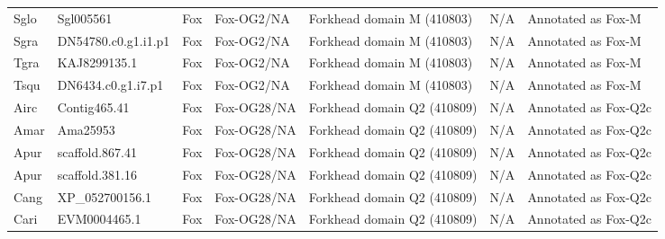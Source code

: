 \documentclass[../main.tex]{subfiles}
\begin{document}
\begin{landscape}
\begin{longtable}{lllllll}
		Sglo           & Sgl005561             & Fox            & Fox-OG2/NA          & Forkhead domain M (410803)                  & N/A                                                                    & Annotated as Fox-M   \\
		Sgra           & DN54780.c0.g1.i1.p1   & Fox            & Fox-OG2/NA          & Forkhead domain M (410803)                  & N/A                                                                    & Annotated as Fox-M   \\
		Tgra           & KAJ8299135.1          & Fox            & Fox-OG2/NA          & Forkhead domain M (410803)                  & N/A                                                                    & Annotated as Fox-M   \\
		Tsqu           & DN6434.c0.g1.i7.p1    & Fox            & Fox-OG2/NA          & Forkhead domain M (410803)                  & N/A                                                                    & Annotated as Fox-M   \\
		Airc           & Contig465.41          & Fox            & Fox-OG28/NA         & Forkhead domain Q2 (410809)                 & N/A                                                                    & Annotated as Fox-Q2c \\
		Amar           & Ama25953              & Fox            & Fox-OG28/NA         & Forkhead domain Q2 (410809)                 & N/A                                                                    & Annotated as Fox-Q2c \\
		Apur           & scaffold.867.41       & Fox            & Fox-OG28/NA         & Forkhead domain Q2 (410809)                 & N/A                                                                    & Annotated as Fox-Q2c \\
		Apur           & scaffold.381.16       & Fox            & Fox-OG28/NA         & Forkhead domain Q2 (410809)                 & N/A                                                                    & Annotated as Fox-Q2c \\
		Cang           & XP\_052700156.1       & Fox            & Fox-OG28/NA         & Forkhead domain Q2 (410809)                 & N/A                                                                    & Annotated as Fox-Q2c \\
		Cari           & EVM0004465.1          & Fox            & Fox-OG28/NA         & Forkhead domain Q2 (410809)                 & N/A                                                                    & Annotated as Fox-Q2c \\

\end{longtable}
\end{landscape}
\end{document}
